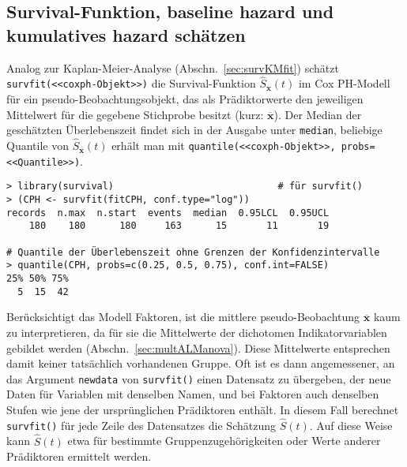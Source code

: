 \subsection{Survival-Funktion, baseline hazard und kumulatives hazard schätzen}
\label{sec:CoxHat}

Analog zur Kaplan-Meier-Analyse (Abschn.\ \ref{sec:survKMfit}) schätzt \lstinline!survfit(<<coxph-Objekt>>)! die Survival-Funktion $\hat{S}_{\overline{\bm{x}}}(t)$ im Cox PH-Modell für ein pseudo-Beobachtungsobjekt, das als Prädiktorwerte den jeweiligen Mittelwert für die gegebene Stichprobe besitzt (kurz: $\overline{\bm{x}}$). Der Median der geschätzten Überlebenszeit findet sich in der Ausgabe unter \lstinline!median!, beliebige Quantile von $\hat{S}_{\overline{\bm{x}}}(t)$ erhält man mit \lstinline!quantile(<<coxph-Objekt>>, probs=<<Quantile>>)!.
\begin{lstlisting}
> library(survival)                             # für survfit()
> (CPH <- survfit(fitCPH, conf.type="log"))
records  n.max  n.start  events  median  0.95LCL  0.95UCL
    180    180      180     163      15       11       19

# Quantile der Überlebenszeit ohne Grenzen der Konfidenzintervalle
> quantile(CPH, probs=c(0.25, 0.5, 0.75), conf.int=FALSE)
25% 50% 75%
  5  15  42
\end{lstlisting}

Berücksichtigt das Modell Faktoren, ist die mittlere pseudo-Beobachtung $\overline{\bm{x}}$ kaum zu interpretieren, da für sie die Mittelwerte der dichotomen Indikatorvariablen gebildet werden (Abschn.\ \ref{sec:multALManova}). Diese Mittelwerte entsprechen damit keiner tatsächlich vorhandenen Gruppe. Oft ist es dann angemessener, an das Argument \lstinline!newdata! von \lstinline!survfit()! einen Datensatz zu übergeben, der neue Daten für Variablen mit denselben Namen, und bei Faktoren auch denselben Stufen wie jene der ursprünglichen Prädiktoren enthält. In diesem Fall berechnet \lstinline!survfit()! für jede Zeile des Datensatzes die Schätzung $\hat{S}(t)$. Auf diese Weise kann $\hat{S}(t)$ etwa für bestimmte Gruppenzugehörigkeiten oder Werte anderer Prädiktoren ermittelt werden.

